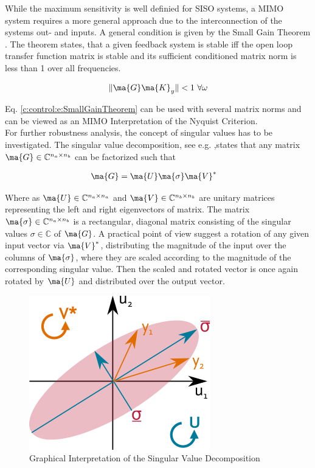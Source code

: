 While the maximum sensitivity is well definied for SISO systems, a MIMO system requires a more general approach due to the interconnection of the systems out- and inputs. A general condition is given by the Small Gain Theorem \cite[p.150 ff.]{Skogestad2005MultivariableDesign}. The theorem states, that a given feedback system is stable iff the open loop transfer function matrix is stable and its sufficient conditioned matrix norm is less than 1 over all frequencies.

\begin{align}
\lVert \ma{G} \ma{K}_y \rVert < 1 ~\forall \omega
\label{c:control:e:SmallGainTheorem}
\end{align}

Eq. \ref{c:control:e:SmallGainTheorem} can be used with several matrix norms and can be viewed as an MIMO Interpretation of the Nyquist Criterion. \\

For further robustness analysis, the concept of singular values has to be investigated. The singular value decomposition, see e.g. \cite[p.144 f.]{2013Springer-HandbuchIII},states that any matrix $\ma{G} \in \mathbb{C}^{n_a\times n_b}$ can be factorized such that

\begin{align}
\ma{G} &= \ma{U}\ma{\sigma}\ma{V}^*
\label{c:control:e:SVD}
\end{align}

Where as $\ma{U} \in \mathbb{C}^{n_a \times n_a}$ and $\ma{V} \in \mathbb{C}^{n_b \times n_b} $ are unitary matrices representing the left and right eigenvectors of matrix. The matrix $\ma{\sigma} \in \mathbb{C}^{n_a \times n_b}$ is a rectangular, diagonal matrix consisting of the singular values $\sigma \in \mathbb{C}$ of $\ma{G}$. A practical point of view suggest a rotation of any given input vector via $\ma{V}^*$, distributing the magnitude of the input over the columns of $\ma{\sigma}$, where they are scaled according to the magnitude of the corresponding singular value. Then the scaled and rotated vector is once again rotated by $\ma{U}$ and distributed over the output vector. \\

\begin{figure}[H]
\begin{minipage}[b]{\textwidth}
\centering
\includegraphics[scale=1]{./Graphics/SVD.png}
\caption{Graphical Interpretation of the Singular Value Decomposition}
\label{c:control:f:SVD}
\end{minipage}
\end{figure}



